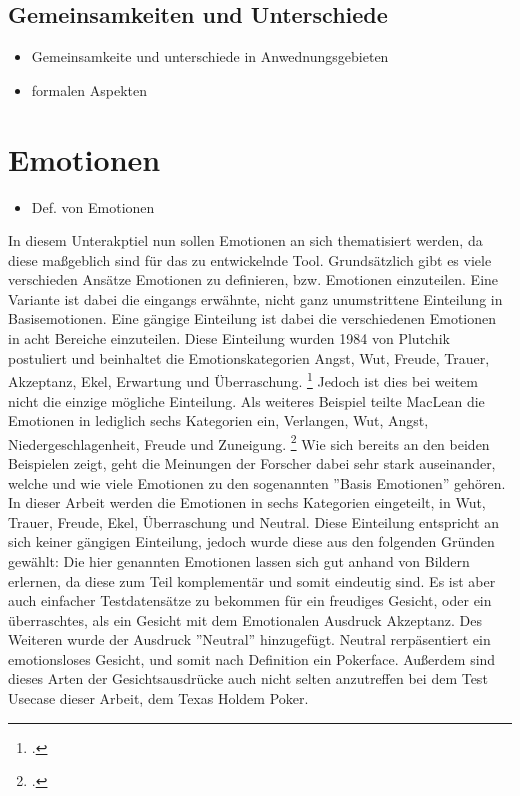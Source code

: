 \documentclass[12pt, a4paper]{scrbook}
\begin{document}
 
\subsection{Gemeinsamkeiten und Unterschiede}
\begin{itemize}
\item Gemeinsamkeite und unterschiede in Anwednungsgebieten
\item formalen Aspekten
\end{itemize}

\section{Emotionen}

\begin{itemize}
\item Def. von Emotionen
\end{itemize}

In diesem Unterakptiel nun sollen Emotionen an sich thematisiert werden, da diese maßgeblich sind für das zu entwickelnde Tool. Grundsätzlich gibt es viele verschieden Ansätze Emotionen zu
definieren, bzw. Emotionen einzuteilen. Eine Variante ist dabei die eingangs erwähnte, nicht ganz unumstrittene Einteilung in Basisemotionen. Eine gängige Einteilung ist dabei die verschiedenen
Emotionen in acht Bereiche einzuteilen. Diese Einteilung wurden 1984 von Plutchik postuliert und beinhaltet die Emotionskategorien Angst, Wut, Freude, Trauer, Akzeptanz, Ekel, Erwartung und
Überraschung.
\footcite[Vgl. ][3]{FaceRec}
Jedoch ist dies bei weitem nicht die einzige mögliche Einteilung. Als weiteres Beispiel teilte MacLean die Emotionen in lediglich sechs Kategorien ein, Verlangen, Wut, Angst,
Niedergeschlagenheit, Freude und Zuneigung.
\footcite[Vgl. ][3]{FaceRec}
Wie sich bereits an den beiden Beispielen zeigt, geht die Meinungen der Forscher dabei sehr stark auseinander, welche und wie viele Emotionen zu den sogenannten ''Basis Emotionen'' gehören. In
dieser Arbeit werden die Emotionen in sechs Kategorien eingeteilt, in Wut, Trauer, Freude, Ekel, Überraschung und Neutral. Diese Einteilung entspricht an sich keiner gängigen Einteilung, jedoch
wurde diese aus den folgenden Gründen gewählt: \newline
Die hier genannten Emotionen lassen sich gut anhand von Bildern erlernen, da diese zum Teil komplementär und somit eindeutig sind. Es ist aber auch einfacher Testdatensätze zu bekommen für ein
freudiges Gesicht, oder ein überraschtes, als ein Gesicht mit dem Emotionalen Ausdruck Akzeptanz. Des Weiteren wurde der Ausdruck ''Neutral'' hinzugefügt. Neutral rerpäsentiert ein emotionsloses
Gesicht, und somit nach Definition ein Pokerface. Außerdem sind dieses Arten der Gesichtsausdrücke auch nicht selten anzutreffen bei dem Test Usecase dieser Arbeit, dem Texas Holdem Poker.
\end{document}
